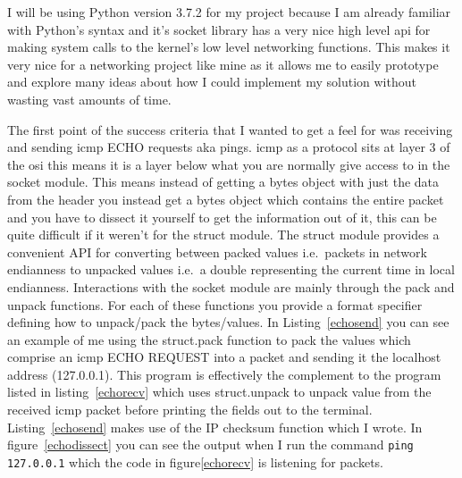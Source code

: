 \documentclass[titlepage]{article}
\begin{document}
I will be using Python version 3.7.2 for my project because I am already familiar with Python's
syntax and it's socket library has a very nice high level \gls{api} for making system calls to
the kernel's low level networking functions. This makes it very nice for a networking project
like mine as it allows me to easily prototype and explore many ideas about how I could implement
my solution without wasting vast amounts of time.

The first point of the success criteria that I wanted to get a feel for was receiving and sending
\gls{icmp} ECHO requests aka pings. \gls{icmp} as a protocol sits at layer 3 of the \gls{osi}
this means it is a layer below what you are normally give access to in the socket module. This
means instead of getting a bytes object with just the data from the header you instead get a bytes
object which contains the entire packet and you have to dissect it yourself to get the information
out of it, this can be quite difficult if it weren't for the struct module. The struct module 
provides a convenient API for converting between packed values i.e.\ packets in network endianness
to unpacked values i.e.\ a double representing the current time in local endianness. Interactions
with the socket module are mainly through the pack and unpack functions. For each of these
functions you provide a format specifier defining how to unpack/pack the bytes/values. 
In Listing~\ref{echosend} you can see an example of me using the struct.pack function to pack
the values which comprise an \gls{icmp} ECHO REQUEST into a packet and sending it the localhost
address (127.0.0.1). This program is effectively the complement to the program listed in
listing~\ref{echorecv} which uses struct.unpack to unpack value from the received \gls{icmp}
packet before printing the fields out to the terminal. Listing~\ref{echosend} makes use of the
IP checksum function which I wrote. In figure~\ref{echodissect} you can see the output when
I run the command \verb|ping 127.0.0.1| which the code in figure\ref{echorecv} is listening for
packets.
\end{document}
